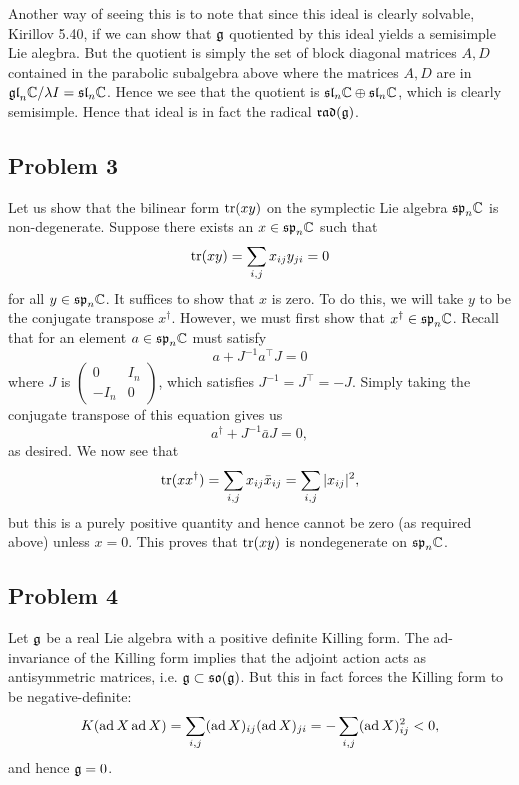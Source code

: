 \documentclass{../../mathnotes}
\begin{document}
Another way of seeing this is to note that since this ideal is clearly solvable, Kirillov 5.40, if we can show that $\mathfrak g$ quotiented by
this ideal yields a semisimple Lie alegbra. But the quotient is simply the set of block diagonal matrices $A,D$ contained in the parabolic subalgebra
above where the matrices $A,D$ are in $\mathfrak{gl}_n\mathbb{C}/\lambda I=\mathfrak{sl}_n\mathbb{C}$. Hence we see that the quotient is $\mathfrak{sl}_n\mathbb{C}\oplus\mathfrak{sl}_n\mathbb{C}$, which
is clearly semisimple. Hence that ideal is in fact the radical $\mathfrak{rad}(\mathfrak g)$.

\subsection*{Problem 3}

Let us show that the bilinear form $\operatorname{tr}(xy)$ on the symplectic Lie algebra $\mathfrak{sp}_n\mathbb{C}$ is non-degenerate. Suppose
there exists an $x\in\mathfrak{sp}_n\mathbb{C}$ such that
\[\operatorname{tr}(xy)=\sum_{i,j}x_{ij}y_{ji}=0\]
for all $y\in\mathfrak{sp}_n\mathbb{C}$. It suffices to show that $x$ is zero. To do this, we will take $y$ to be the conjugate transpose $x^\dagger$.
However, we must first show that $x^\dagger\in\mathfrak{sp}_n\mathbb{C}$. Recall that for an element $a\in\mathfrak{sp}_n\mathbb{C}$ must satisfy
\[a+J^{-1}a^\intercal J=0\]
where $J$ is $\begin{pmatrix}0&I_n\\-I_n&0\end{pmatrix}$, which satisfies $J^{-1}=J^\intercal=-J$. Simply taking the conjugate transpose of this equation gives us
\[a^\dagger+J^{-1}\bar a J=0,\]
as desired. We now see that
\[\operatorname{tr}(xx^\dagger)=\sum_{i,j}x_{ij}\bar x_{ij}=\sum_{i,j}|x_{ij}|^2,\]
but this is a purely positive quantity and hence cannot be zero (as required above) unless $x=0$. This proves that $\operatorname{tr}(xy)$ is nondegenerate
on $\mathfrak{sp}_n\mathbb{C}$.

\subsection*{Problem 4}

Let $\mathfrak g$ be a real Lie algebra with a positive definite Killing form. The ad-invariance of the Killing form implies that the adjoint action
acts as antisymmetric matrices, i.e. $\mathfrak g\subset \mathfrak{so}(\mathfrak g)$. But this in fact forces the Killing form to be negative-definite:
\begin{align*}
    K(\operatorname{ad} X\operatorname{ad} X)=\sum_{i,j} (\operatorname{ad} X)_{ij}(\operatorname{ad} X)_{ji}=-\sum_{i,j}(\operatorname{ad} X)_{ij}^2<0,
\end{align*}
and hence $\mathfrak g=0$.
\end{document}
